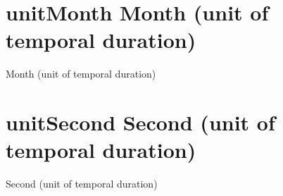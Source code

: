 \documentclass[letterpaper,10pt,english]{sphinxmanual}
\begin{document}
\section{unitMonth \sphinxhyphen{} Month (unit of temporal duration)}
\label{\detokenize{doc-unitMonth:unitmonth-month-unit-of-temporal-duration}}\label{\detokenize{doc-unitMonth:index-0}}\label{\detokenize{doc-unitMonth::doc}}
\begin{sphinxShadowBox}

\sphinxAtStartPar
Month (unit of temporal duration)
\end{sphinxShadowBox}
\begin{quote}
\label{\detokenize{doc-unitSecond:unitsecond}}\label{\detokenize{doc-unitSecond:second-unit-of-temporal-duration}}\label{\detokenize{doc-unitSecond:unitsecond}}
\ignorespaces \end{quote}


\section{unitSecond \sphinxhyphen{} Second (unit of temporal duration)}
\label{\detokenize{doc-unitSecond:unitsecond-second-unit-of-temporal-duration}}\label{\detokenize{doc-unitSecond:index-0}}\label{\detokenize{doc-unitSecond::doc}}
\begin{sphinxShadowBox}

\sphinxAtStartPar
Second (unit of temporal duration)
\end{sphinxShadowBox}
\begin{quote}
\label{\detokenize{doc-unitWeek:unitweek}}\label{\detokenize{doc-unitWeek:week-unit-of-temporal-duration}}\label{\detokenize{doc-unitWeek:unitweek}}
\ignorespaces \end{quote}
\end{document}
